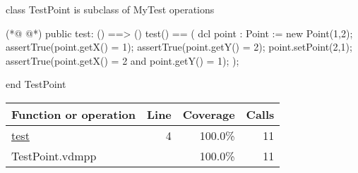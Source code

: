 \begin{vdmpp}[breaklines=true]
class TestPoint is subclass of MyTest
operations

(*@
\label{test:4}
@*)
 public test: () ==> ()
 test() ==
 (
  dcl point : Point := new Point(1,2);
  assertTrue(point.getX() = 1);
  assertTrue(point.getY() = 2);
  point.setPoint(2,1);
  assertTrue(point.getX() = 2 and point.getY() = 1);
 );


end TestPoint
\end{vdmpp}
\bigskip
\begin{longtable}{|l|r|r|r|}
\hline
Function or operation & Line & Coverage & Calls \\
\hline
\hline
\hyperref[test:4]{test} & 4&100.0\% & 11 \\
\hline
\hline
TestPoint.vdmpp & & 100.0\% & 11 \\
\hline
\end{longtable}

